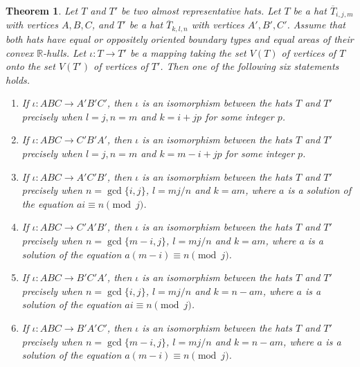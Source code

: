 \documentclass[12pt]{amsart}
\def\mbR{\mathbb{R}}
\newcommand{\ovT}{\overline{T}}
\theoremstyle{plain}
\newtheorem{theorem}{Theorem}[section]
\theoremstyle{definition}
\numberwithin{equation}{section}
\begin{document}
\begin{theorem}\label{T:arhathat}
Let $T$ and $T'$ be two almost representative hats. Let $T$ be a hat $\ovT_{i,j,m}$ with
vertices $A, B, C$, and $T'$ be a hat $\ovT_{k,l,n}$ with vertices $A', B', C'$. Assume that
both hats have equal or oppositely oriented boundary types and equal areas of their convex
$\mbR$-hulls. Let $\iota:T \rightarrow T'$ be a mapping taking the set $V(T)$ of vertices of $T$ onto the set $V(T')$ of vertices of $T'$. Then one of the following six statements
holds.
\begin{enumerate}
\item[(a)] If $\iota: ABC \rightarrow A'B'C'$, then $\iota$ is an isomorphism  between the hats $T$ and $T'$  precisely when $l = j, n = m$ and $k = i + jp$ for some integer $p$.
\item[(b)] If $\iota: ABC \rightarrow C'B'A'$, then $\iota$ is an isomorphism  between the
    hats $T$ and $T'$  precisely when $l = j, n = m$ and $k = m-i + jp$ for some integer
    $p$.
\item[(c)] If $\iota: ABC \rightarrow A'C'B'$, then $\iota$ is an isomorphism  between the
    hats $T$ and $T'$  precisely when
    $n = \gcd\{i,j\}$, $l = mj/n$ and $k = am$, where $a$ is a solution of the equation $ai
    \equiv n \pmod{j}$.
\item[(d)] If $\iota: ABC \rightarrow C'A'B'$, then $\iota$ is an isomorphism between the
    hats $T$ and $T'$  precisely when
    $n = \gcd\{m-i,j\}$, $l = mj/n$ and $k = am$, where $a$ is a solution of the equation
    $a(m-i) \equiv n \pmod{j}$.
\item[(e)] If $\iota: ABC \rightarrow B'C'A'$, then $\iota$ is an isomorphism  between the
    hats $T$ and $T'$  precisely when
    $n = \gcd\{i,j\}$, $l = mj/n$ and $k = n-am$, where $a$ is a solution of the equation $ai \equiv n \pmod{j}$.
\item[(f)] If $\iota: ABC \rightarrow B'A'C'$, then $\iota$ is an isomorphism  between the
    hats $T$ and $T'$  precisely when
    $n = \gcd\{m-i,j\}$, $l = mj/n$ and $k = n-am$, where $a$ is a solution of the equation
    $a(m-i) \equiv n \pmod{j}$.
\end{enumerate}
\end{theorem}
\end{document}
